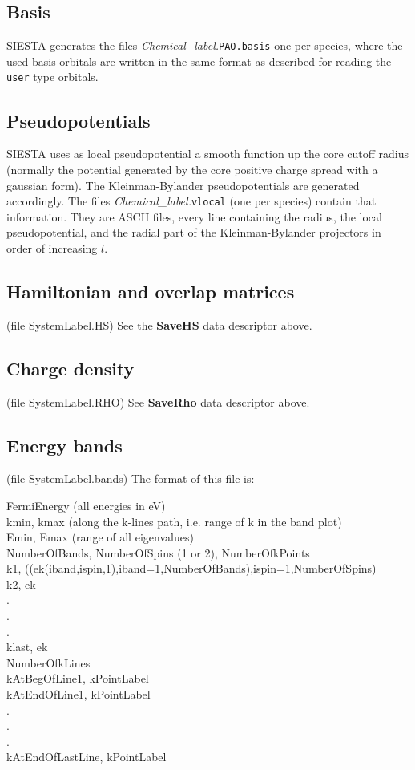 \subsection{Basis}
SIESTA generates the files
{\it Chemical\_label.}{\tt PAO.basis}
one per species, where the used basis orbitals are written in the 
same format as described for reading the {\tt user} type orbitals.


\subsection{Pseudopotentials}
SIESTA uses as local pseudopotential a smooth function up the core cutoff
radius (normally the potential generated by the core positive charge 
spread with a gaussian form). The Kleinman-Bylander pseudopotentials
are generated accordingly. The files
{\it Chemical\_label.}{\tt vlocal}
\noindent
(one per species) contain that information. They are ASCII files, every
line containing the radius, the local pseudopotential, and the radial
part of the Kleinman-Bylander projectors in order of increasing $l$.


\subsection{Hamiltonian and overlap matrices}
(file SystemLabel.HS) See the {\bf SaveHS} data descriptor above.


\subsection{Charge density}
(file SystemLabel.RHO) See {\bf SaveRho} data descriptor above.


\subsection{Energy bands}
(file SystemLabel.bands) The format of this file is:

\noindent
FermiEnergy (all energies in eV) \\
kmin, kmax (along the k-lines path, i.e. range of k in the band plot) \\
Emin, Emax (range of all eigenvalues) \\
NumberOfBands, NumberOfSpins (1 or 2), NumberOfkPoints \\
k1, ((ek(iband,ispin,1),iband=1,NumberOfBands),ispin=1,NumberOfSpins) \\
k2, ek \\
 . \\
 . \\
 . \\
klast, ek \\
NumberOfkLines \\
kAtBegOfLine1, kPointLabel \\
kAtEndOfLine1, kPointLabel \\
  . \\
  . \\
  . \\
kAtEndOfLastLine, kPointLabel \\

